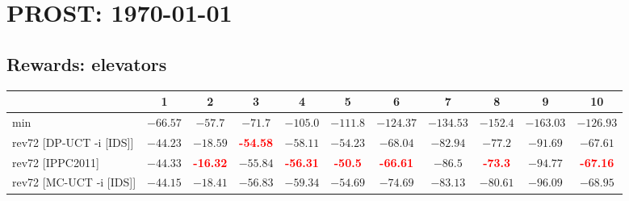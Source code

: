 \documentclass{article}
\begin{document}
\section*{PROST: \today\ \thistime}

\subsection*{Rewards: elevators}

\begin{tabular}{|l|r@{$\pm$}rr@{$\pm$}rr@{$\pm$}rr@{$\pm$}rr@{$\pm$}rr@{$\pm$}rr@{$\pm$}rr@{$\pm$}rr@{$\pm$}rr@{$\pm$}r|}
\hline

& \multicolumn{2}{c}{1}
& \multicolumn{2}{c}{2}
& \multicolumn{2}{c}{3}
& \multicolumn{2}{c}{4}
& \multicolumn{2}{c}{5}
& \multicolumn{2}{c}{6}
& \multicolumn{2}{c}{7}
& \multicolumn{2}{c}{8}
& \multicolumn{2}{c}{9}
& \multicolumn{2}{c|}{10}
\\
\hline
\hline
min
& \multicolumn{2}{c}{$-66.57$}
& \multicolumn{2}{c}{$-57.7$}
& \multicolumn{2}{c}{$-71.7$}
& \multicolumn{2}{c}{$-105.0$}
& \multicolumn{2}{c}{$-111.8$}
& \multicolumn{2}{c}{$-124.37$}
& \multicolumn{2}{c}{$-134.53$}
& \multicolumn{2}{c}{$-152.4$}
& \multicolumn{2}{c}{$-163.03$}
& \multicolumn{2}{c|}{$-126.93$}
\\
rev72 [DP-UCT -i [IDS]]
& \multicolumn{2}{c}{$-44.23$}
& \multicolumn{2}{c}{$-18.59$}
& \multicolumn{2}{c}{\textbf{\textcolor{red}{-54.58}}}
& \multicolumn{2}{c}{$-58.11$}
& \multicolumn{2}{c}{$-54.23$}
& \multicolumn{2}{c}{$-68.04$}
& \multicolumn{2}{c}{$-82.94$}
& \multicolumn{2}{c}{$-77.2$}
& \multicolumn{2}{c}{$-91.69$}
& \multicolumn{2}{c|}{$-67.61$}
\\
rev72 [IPPC2011]
& \multicolumn{2}{c}{$-44.33$}
& \multicolumn{2}{c}{\textbf{\textcolor{red}{-16.32}}}
& \multicolumn{2}{c}{$-55.84$}
& \multicolumn{2}{c}{\textbf{\textcolor{red}{-56.31}}}
& \multicolumn{2}{c}{\textbf{\textcolor{red}{-50.5}}}
& \multicolumn{2}{c}{\textbf{\textcolor{red}{-66.61}}}
& \multicolumn{2}{c}{$-86.5$}
& \multicolumn{2}{c}{\textbf{\textcolor{red}{-73.3}}}
& \multicolumn{2}{c}{$-94.77$}
& \multicolumn{2}{c|}{\textbf{\textcolor{red}{-67.16}}}
\\
rev72 [MC-UCT -i [IDS]]
& \multicolumn{2}{c}{$-44.15$}
& \multicolumn{2}{c}{$-18.41$}
& \multicolumn{2}{c}{$-56.83$}
& \multicolumn{2}{c}{$-59.34$}
& \multicolumn{2}{c}{$-54.69$}
& \multicolumn{2}{c}{$-74.69$}
& \multicolumn{2}{c}{$-83.13$}
& \multicolumn{2}{c}{$-80.61$}
& \multicolumn{2}{c}{$-96.09$}
& \multicolumn{2}{c|}{$-68.95$}
\\

\end{tabular}
\end{document}
